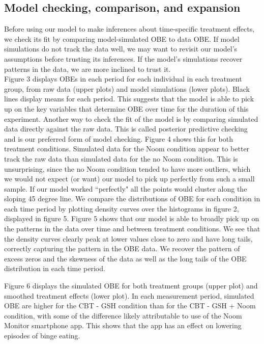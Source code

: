 \documentclass{article}
\begin{document}
\subsection*{Model checking, comparison, and expansion}
Before using our model to make inferences about time-specific treatment effects, we check its fit by comparing model-simulated OBE to data OBE.  If model simulations do not track the data well, we may want to revisit our model's assumptions before trusting its inferences.  If the model's simulations recover patterns in the data, we are more inclined to trust it. \\
Figure 3 displays OBEs in each period for each individual in each treatment group, from raw data (upper plots) and model simulations (lower plots).  Black lines display means for each period.  This suggests that the model is able to pick up on the key variables that determine OBE over time for the duration of this experiment.
%
%
Another way to check the fit of the model is by comparing simulated data directly against the raw data.  This is called posterior predictive checking and is our preferred form of model checking. Figure 4 shows this for both treatment conditions.  Simulated data for the Noom condition appear to better track the raw data than simulated data for the no Noom condition.  This is unsurprising, since the no Noom condition tended to have more outliers, which we would not expect (or want) our model to pick up perfectly from such a small sample. If our model worked ``perfectly" all the points would cluster along the sloping 45 degree line.
%
%
We compare the distributions of OBE for each condition in each time period by plotting density curves over the histograms in figure 2, displayed in figure 5. Figure 5 shows that our model is able to broadly pick up on the patterns in the data over time and between treatment conditions. We see that the density curves clearly peak at lower values close to zero and have long tails, correctly capturing the pattern in the OBE data. We recover the pattern of excess zeros and the skewness of the data as well as the long tails of the OBE distribution in each time period.

%
%
Figure 6 displays the simulated OBE for both treatment groups (upper plot) and smoothed treatment effects (lower plot).  In each measurement period, simulated OBE are higher for the CBT - GSH condition than for the CBT - GSH + Noom condition, with some of the difference likely attributable to use of the Noom Monitor smartphone app.  This shows that the app has an effect on lowering episodes of binge eating.
\end{document}
